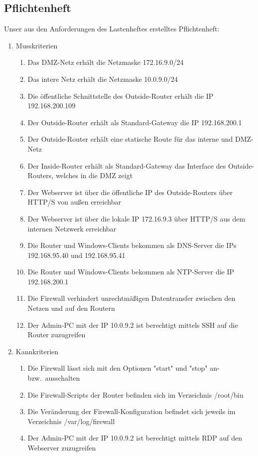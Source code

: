 \subsection{Pflichtenheft}
\label{app:Pflichtenheft}

Unser aus den Anforderungen des Lastenheftes erstelltes Pflichtenheft:

\begin{enumerate}[itemsep=0em,partopsep=0em,parsep=0em,topsep=0em]
\item Musskriterien %
    \begin{enumerate}
    \item Das DMZ-Netz erhält die Netzmaske 172.16.9.0/24
    \item Das intere Netz erhält die Netzmaske 10.0.9.0/24
    \item Die öffentliche Schnittstelle des Outside-Router erhält die IP 192.168.200.109
    \item Der Outside-Router erhält als Standard-Gateway die IP 192.168.200.1
    \item Der Outside-Router erhält eine statische Route für das interne und DMZ-Netz
    \item Der Inside-Router erhält als Standard-Gateway das Interface des Outside-Routers, welches in die DMZ zeigt
    \item Der Webserver ist über die öffentliche IP des Outside-Routers über HTTP/S von außen erreichbar
    \item Der Webserver ist über die lokale IP 172.16.9.3 über HTTP/S aus dem internen Netzwerk erreichbar
    \item Die Router und Windows-Clients bekommen als DNS-Server die IPs 192.168.95.40 und 192.168.95.41
    \item Die Router und Windows-Clients bekommen als NTP-Server die IP 192.168.200.1
    \item Die Firewall verhindert unrechtmäßigen Datentransfer zwischen den Netzen und auf den Routern
    \item Der Admin-PC mit der IP 10.0.9.2 ist berechtigt mittels SSH auf die Router zuzugreifen	
    \end{enumerate}
\item Kannkriterien
    \begin{enumerate}
    \item Die Firewall lässt sich mit den Optionen "start" und "stop" an- bzw.\ ausschalten
    \item Die Firewall-Scripts der Router befinden sich im Verzeichnis /root/bin
    \item Die Veränderung der Firewall-Konfiguration befindet sich jeweils im Verzeichnis /var/log/firewall
    \item Der Admin-PC mit der IP 10.0.9.2 ist berechtigt mittels RDP auf den Webserver zuzugreifen
    \end{enumerate}
\end{enumerate}
	